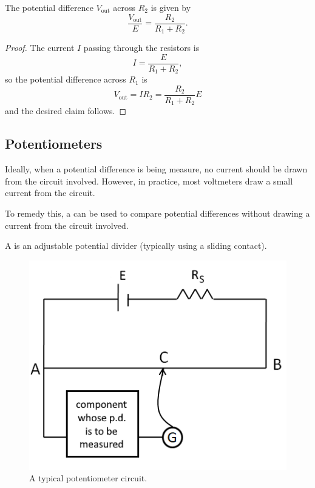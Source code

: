 \begin{proposition}
    The potential difference $V_{\text{out}}$ across $R_2$ is given by \[\frac{V_{\text{out}}}{E} = \frac{R_2}{R_1 + R_2}.\]
\end{proposition}
\begin{proof}
    The current $I$ passing through the resistors is \[I = \frac{E}{R_1 + R_2},\] so the potential difference across $R_1$ is \[V_{\text{out}} = IR_2 = \frac{R_2}{R_1 + R_2} E\] and the desired claim follows.
\end{proof}

\subsection{Potentiometers}

Ideally, when a potential difference is being measure, no current should be drawn from the circuit involved. However, in practice, most voltmeters draw a small current from the circuit.

To remedy this, a  can be used to compare potential differences without drawing a current from the circuit involved.

\begin{definition}
    A  is an adjustable potential divider (typically using a sliding contact).
\end{definition}

\begin{figure}[H]
    \centering
    \includegraphics[scale=0.6]{media/Potentiometer Principle.png}
    \caption{A typical potentiometer circuit.}
\end{figure}

